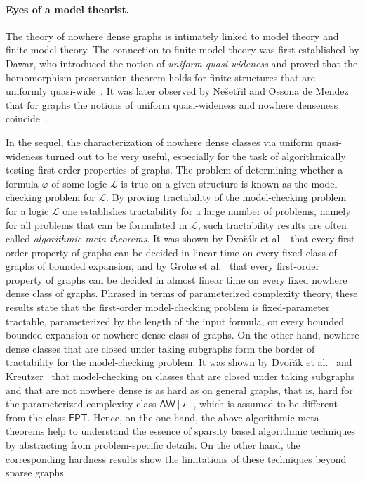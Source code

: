 \paragraph*{Eyes of a model theorist.}
The theory of nowhere dense graphs is intimately linked to model
theory and finite model theory. The connection to finite model
theory was first established by Dawar, who introduced the notion
of \emph{uniform quasi-wideness} and proved that the homomorphism
preservation theorem holds for finite structures that are uniformly
quasi-wide~\cite{dawar2010homomorphism}. It was later
observed by Ne\v{s}et\v{r}il and Ossona de Mendez that for graphs
the notions of uniform quasi-wideness and nowhere denseness
coincide~\cite{nevsetvril2010first}. 

In the sequel, the characterization of nowhere dense classes via
uniform quasi-wideness turned out to be very useful, especially 
for the task of algorithmically testing first-order properties of
graphs. The problem of determining whether a formula $\varphi$
of some logic $\mathcal{L}$ is true on a given structure is known 
as the model-checking problem for $\mathcal{L}$. By proving
tractability of the model-checking problem for a logic $\mathcal{L}$
one establishes tractability for a large number of problems, namely
for all problems that can be formulated in $\mathcal{L}$, such 
tractability results are often called \emph{algorithmic meta 
theorems}. It was shown by Dvo\v{r}\'ak et al.~\cite{DvorakKT13}
that every first-order property of graphs can be decided in linear time
on every fixed class of graphs of bounded expansion, and by Grohe et 
al.~\cite{grohe2017deciding} that every first-order property of 
graphs can be decided in almost linear time on every fixed nowhere
dense class of graphs. Phrased in terms of parameterized
complexity theory, these results state that the first-order 
model-checking problem is fixed-parameter tractable, parameterized
by the length of the input formula, on every bounded bounded
expansion or nowhere dense class of graphs. On the other hand, 
nowhere dense classes that are closed under taking subgraphs 
form the border of tractability for the model-checking problem. 
It was shown by Dvo\v{r}\'ak et al.~\cite{DvorakKT13} and
Kreutzer~\cite{kre11} that model-checking on classes that
are closed under taking subgraphs and that are not nowhere
dense is as hard as on general graphs, that is, hard for the
parameterized complexity class $\mathsf{AW}[\star]$, which is
assumed to be different from the class $\mathsf{FPT}$. 
Hence, on the one hand, the above algorithmic meta theorems 
help to understand the essence of sparsity
based algorithmic techniques by abstracting from problem-specific
details. On the other hand, the corresponding hardness results show 
the limitations of these techniques beyond sparse graphs. 

